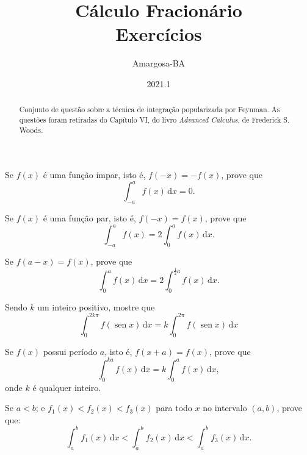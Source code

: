 \documentclass[11pt, a5paper]{exam}
\title{\textbf{Cálculo Fracionário}\\ \textbf{Exercícios}}
\author{Amargosa-BA}
\date{2021.1}
\DeclareMathOperator{\sen}{sen}
\newcommand{\dd}{\,\mathrm{d}}
\begin{document}
%
\maketitle
%
%
\begin{abstract}
Conjunto de questão sobre a técnica de integração popularizada por Feynman.
As questões foram retiradas do Capítulo VI, do livro \textit{Advanced Calculus}, 
de Frederick S. Woods.
\end{abstract}
%
\begin{questions}
%

\question
Se $ f(x) $ é uma função ímpar, isto é, $ f(-x) = -f(x) $, prove que
\[
  \int_{-a}^{a} f(x) \dd{x} = 0. 
\] 

\question 
Se $ f(x) $ é uma função par, isto é, $ f(-x) = f(x) $, prove que
\[
  \int_{-a}^{a} f(x) = 2\int_{0}^{a} f(x) \dd x. 
\] 

\question 
Se $ f(a - x) = f(x) $, prove que
\[
  \int_{0}^{a} f(x) \dd{x} = 2 \int_{0}^{\frac{1}{2}a} f(x) \dd{x}.
\]

\question 
Sendo  $k$ um inteiro positivo, mostre que 
\[
  \int_{0}^{2k\pi} f(\sen{x}) \dd{x} = k \int_{0}^{2\pi}  f(\sen{x}) \dd{x}
\] 

\question 
Se $ f(x) $ possui período $ a $, isto é, $ f(x + a) = f(x) $, prove que
\[
  \int_{0}^{ka} f(x) \dd{x} = k \int_{0}^{a} f(x) \dd{x},
\]
onde $ k $ é qualquer inteiro.

\question 
Se $ a < b $; e $ f_1(x) < f_2(x) < f_3(x) $ para todo $ x $ no intervalo 
$ (a, b) $, prove que:
\[
  \int_{a}^{b} f_1(x) \dd{x} < \int_{a}^{b} f_2(x) \dd{x} < \int_{a}^{b} f_3(x) \dd{x}.
\]


\end{questions}
\end{document}
